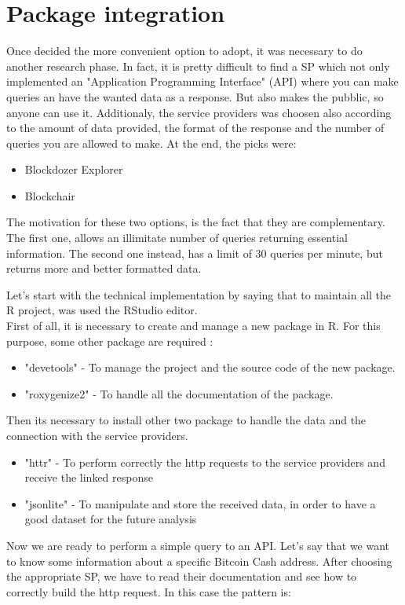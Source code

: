 \section{Package integration}
\label{sec:integration}

Once decided the more convenient option to adopt, it was necessary to do another
research phase. In fact, it is pretty difficult to find a SP which 
not only implemented an "Application Programming Interface" (API) where you can 
make queries an have the wanted data as a response. But also makes the pubblic, 
so anyone can use it. Additionaly, the service providers was choosen also 
according to the amount of data provided, the format of the response and the 
number of queries you are allowed to make. At the end, the picks were:
\begin{itemize}
    \item Blockdozer Explorer
    \item Blockchair
\end{itemize} 
The motivation for these two options, is the fact that they are complementary.
The first one, allows an illimitate number of queries returning essential information.
The second one instead, has a limit of 30 queries per minute, but returns more 
and better formatted data. 

Let's start with the technical implementation by saying that to maintain all the R project, 
was used the RStudio editor.\\ 
First of all, it is necessary to create and manage a new package in R. For this 
purpose, some other package are required : 
\begin{itemize}
    \item "devetools"   - To manage the project and the source code of the new package.
    \item "roxygenize2" - To handle all the documentation of the package.
\end{itemize}
Then its necessary to install other two package to handle the data and the connection with 
the service providers.
\begin{itemize}
    \item "httr"        - To perform correctly the http requests to the service providers and receive the linked response
    \item "jsonlite"    - To manipulate and store the received data, in order to have a good dataset for the future analysis
\end{itemize}
Now we are ready to perform a simple query to an API. Let's say that we want to know
some information about a specific Bitcoin Cash address. After choosing the appropriate SP,
we have to read their documentation and see how to correctly build the http request. 
In this case the pattern is: \medskip

